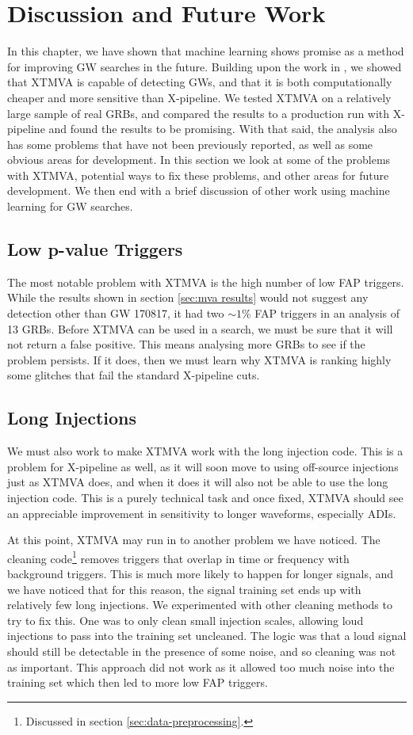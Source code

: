 \documentclass[11pt]{cuthesis}
\newcommand{\xp}{X-pipeline }
\begin{document}
\section{Discussion and Future Work} \label{sec:mva future}
In this chapter, we have shown that machine learning shows promise as a method for improving GW searches in the future. Building upon the work in \cite{adams_mva}, we showed that XTMVA is capable of detecting GWs, and that it is both computationally cheaper and more sensitive than X-pipeline. We tested XTMVA on a relatively large sample of real GRBs, and compared the results to a production run with \xp and found the results to be promising. With that said, the analysis also has some problems that have not been previously reported, as well as some obvious areas for development. In this section we look at some of the problems with XTMVA, potential ways to fix these problems, and other areas for future development. We then end with a brief discussion of other work using machine learning for GW searches.

\subsection{Low p-value Triggers}
The most notable problem with XTMVA is the high number of low FAP triggers. While the results shown in section \ref{sec:mva results} would not suggest any detection other than GW 170817, it had two $\sim1\%$ FAP triggers in an analysis of 13 GRBs. Before XTMVA can be used in a search, we must be sure that it will not return a false positive. This means analysing more GRBs to see if the problem persists. If it does, then we must learn why XTMVA is ranking highly some glitches that fail the standard \xp cuts.

\subsection{Long Injections}
We must also work to make XTMVA work with the long injection code. This is a problem for \xp as well, as it will soon move to using off-source injections just as XTMVA does, and when it does it will also not be able to use the long injection code. This is a purely technical task and once fixed, XTMVA should see an appreciable improvement in sensitivity to longer waveforms, especially ADIs.

At this point, XTMVA may run in to another problem we have noticed. The cleaning code\footnote{Discussed in section \ref{sec:data-preprocessing}.} removes triggers that overlap in time or frequency with background triggers. This is much more likely to happen for longer signals, and we have noticed that for this reason, the signal training set ends up with relatively few long injections. We experimented with other cleaning methods to try to fix this. One was to only clean small injection scales, allowing loud injections to pass into the training set uncleaned. The logic was that a loud signal should still be detectable in the presence of some noise, and so cleaning was not as important. This approach did not work as it allowed too much noise into the training set which then led to more low FAP triggers. 
\end{document}
